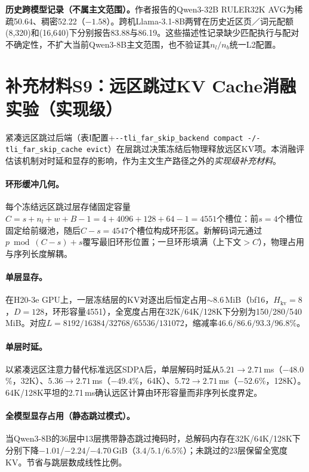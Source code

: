 \documentclass[10pt,letterpaper]{article}
\begin{document}
\begin{sloppypar}
\textbf{历史跨模型记录（不属主文范围）。}作者报告的Qwen3-32B RULER32K AVG为稀疏50.64、稠密52.22（$-1.58$）。跨机Llama-3.1-8B两臂在历史近区页／词元配额(8,320)和(16,640)下分别报告83.88与86.19。这些描述性记录缺少匹配执行与配对不确定性，不扩大当前Qwen3-8B主文范围，也不验证其$n_l/n_b$统一L2配置。
\end{sloppypar}

\clearpage
\section*{补充材料S9：远区跳过KV Cache消融实验（实现级）}

紧凑远区跳过后端（表I配置+\texttt{\mbox{-\/-tli\_far\_skip\_backend compact -/-tli\_far\_skip\_cache evict}}）在层跳过决策冻结后物理释放远区KV项。本消融评估该机制对时延和显存的影响，作为主文生产路径之外的\emph{实现级补充材料}。

\paragraph{环形缓冲几何。}每个冻结远区跳过层存储固定容量$C = s + n_l + w + B - 1 = 4 + 4096 + 128 + 64 - 1 = 4551$个槽位：前$s{=}4$个槽位固定给前缀池，随后$C - s = 4547$个槽位构成环形区。新解码词元通过$p \bmod (C - s) + s$覆写最旧环形位置；一旦环形填满（上下文$> C$），物理占用与序列长度解耦。

\paragraph{单层显存。}在H20-3e GPU上，一层冻结层的KV对逐出后恒定占用$\sim$8.6\,MiB（bf16，$H_\mathrm{kv}{=}8$，$D{=}128$，环形容量4551），全宽度占用在32K/64K/128K下分别为150/280/540\,MiB。对应$L = 8192 / 16384 / 32768 / 65536 / 131072$，缩减率$46.6 / 86.6 / 93.3 / 96.8$\%。

\paragraph{单层时延。}以紧凑远区注意力替代标准远区SDPA后，单层解码时延从$5.21\!\rightarrow\!2.71$\,ms（$-48.0$\%，32K）、$5.36\!\rightarrow\!2.71$\,ms（$-49.4$\%，64K）、$5.72\!\rightarrow\!2.71$\,ms（$-52.6$\%，128K）。64K/128K平坦的2.71\,ms确认远区计算由环形容量而非序列长度界定。

\paragraph{全模型显存占用（静态跳过模式）。}当Qwen3-8B的36层中13层携带静态跳过掩码时，总解码内存在32K/64K/128K下分别下降$-1.01$/$-2.24$/$-4.70$\,GiB（$3.4/5.1/6.5$\%）；未跳过的23层保留全宽度KV。节省与跳层数成线性比例。
\end{document}
